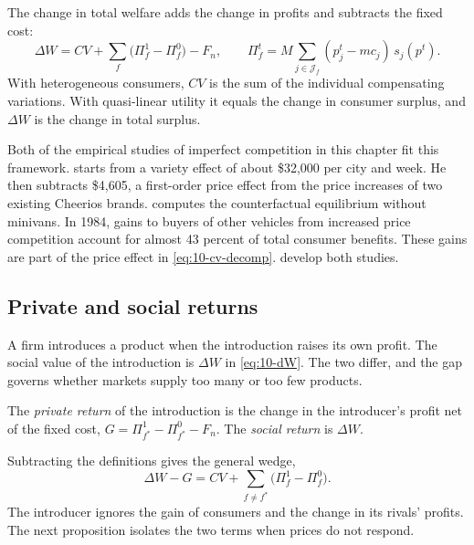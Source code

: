 The change in total welfare adds the change in profits and subtracts the fixed cost:
\begin{equation}\label{eq:10-dW}
  \Delta W = CV + \sum_f\bigl(\Pi_f^1 - \Pi_f^0\bigr) - F_n, \qquad
  \Pi_f^t = M\sum_{j\in\mathcal{J}_f}(p_j^t - mc_j)\,s_j(p^t).
\end{equation}
With heterogeneous consumers, $CV$ is the sum of the individual compensating variations. With quasi-linear
utility it equals the change in consumer surplus, and $\Delta W$ is the change in total surplus.

Both of the empirical studies of imperfect competition in this chapter fit this framework.
\citet[p.~234]{Hausman1997} starts from a variety effect of about \$32,000 per city and week. He then
subtracts \$4,605, a first-order price effect from the price increases of two existing Cheerios brands.
\citet[p.~720]{Petrin2002} computes the counterfactual equilibrium without minivans. In 1984, gains to buyers
of other vehicles from increased price competition account for almost 43 percent of total consumer benefits.
These gains are part of the price effect in \eqref{eq:10-cv-decomp}. 
develop both studies.

\subsection{Private and social returns}\label{sec:10-private-social}

A firm introduces a product when the introduction raises its own profit. The social value of the
introduction is $\Delta W$ in \eqref{eq:10-dW}. The two differ, and the gap governs whether markets supply too
many or too few products.

\begin{definition}\label{def:10-returns}
The \emph{private return} of the introduction is the change in the introducer's profit net of the fixed cost,
$G = \Pi_{f^*}^1 - \Pi_{f^*}^0 - F_n$. The \emph{social return} is $\Delta W$.
\end{definition}

Subtracting the definitions gives the general wedge,
\begin{equation}\label{eq:10-wedge-general}
  \Delta W - G = CV + \sum_{f\neq f^*}\bigl(\Pi_f^1 - \Pi_f^0\bigr).
\end{equation}
The introducer ignores the gain of consumers and the change in its rivals' profits. The next proposition
isolates the two terms when prices do not respond.


